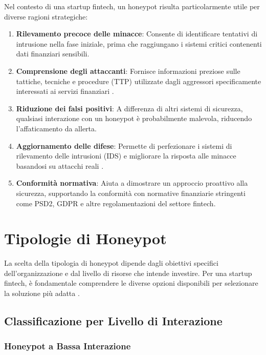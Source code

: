 Nel contesto di una startup fintech, un honeypot risulta particolarmente utile per diverse ragioni strategiche:

\begin{enumerate}
    \item \textbf{Rilevamento precoce delle minacce}: Consente di identificare tentativi di intrusione nella fase iniziale, prima che raggiungano i sistemi critici contenenti dati finanziari sensibili.
    \item \textbf{Comprensione degli attaccanti}: Fornisce informazioni preziose sulle tattiche, tecniche e procedure (TTP) utilizzate dagli aggressori specificamente interessati ai servizi finanziari \cite{vito2024}.
    \item \textbf{Riduzione dei falsi positivi}: A differenza di altri sistemi di sicurezza, qualsiasi interazione con un honeypot è probabilmente malevola, riducendo l'affaticamento da allerta.
    \item \textbf{Aggiornamento delle difese}: Permette di perfezionare i sistemi di rilevamento delle intrusioni (IDS) e migliorare la risposta alle minacce basandosi su attacchi reali \cite{fortinet2023}.
    \item \textbf{Conformità normativa}: Aiuta a dimostrare un approccio proattivo alla sicurezza, supportando la conformità con normative finanziarie stringenti come PSD2, GDPR e altre regolamentazioni del settore fintech.
\end{enumerate}

\section{Tipologie di Honeypot}
\label{sec:tipologie}

La scelta della tipologia di honeypot dipende dagli obiettivi specifici dell'organizzazione e dal livello di risorse che intende investire. Per una startup fintech, è fondamentale comprendere le diverse opzioni disponibili per selezionare la soluzione più adatta \cite{perego_2023}.

\subsection{Classificazione per Livello di Interazione}
\label{subsec:class_interazione}

\subsubsection{Honeypot a Bassa Interazione}
\label{subsubsec:bassa_interazione}

